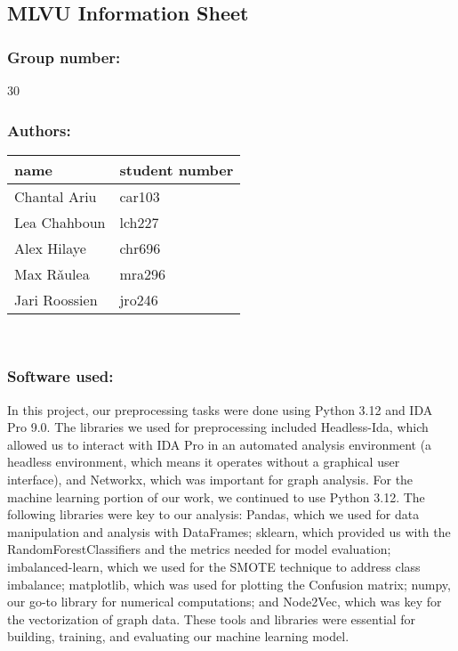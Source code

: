 \documentclass[11pt]{article}
\begin{document}
\newpage

\begin{titlepage}

\section*{MLVU Information Sheet}
\vspace{12pt}

\subsubsection*{Group number:} 
30
\\
\subsubsection*{Authors:}
\vspace{12pt}
\begin{tabular}{l l}
name & student number \\
\hline
Chantal Ariu & car103 \\
Lea Chahboun & lch227 \\
Alex Hilaye & chr696 \\
Max Rǎulea & mra296 \\
Jari Roossien & jro246  \\
\end{tabular}
\\
\subsubsection*{Software used:} 

In this project, our preprocessing tasks were done  using Python 3.12 and IDA Pro 9.0. The libraries we used for preprocessing included Headless-Ida, which allowed us to interact with IDA Pro in an automated analysis environment (a headless environment, which means it operates without a graphical user interface), and Networkx, which was important for graph analysis.
For the machine learning portion of our work, we continued to use Python 3.12. The following libraries were key to our analysis: Pandas, which we used for data manipulation and analysis with DataFrames; sklearn, which provided us with the RandomForestClassifiers and the metrics needed for model evaluation; imbalanced-learn, which we used for the SMOTE technique to address class imbalance; matplotlib, which was used for plotting the Confusion matrix; numpy, our go-to library for numerical computations; and Node2Vec, which was key for the vectorization of graph data. These tools and libraries were essential for building, training, and evaluating our machine learning model.
\\

\end{titlepage}
\end{document}
